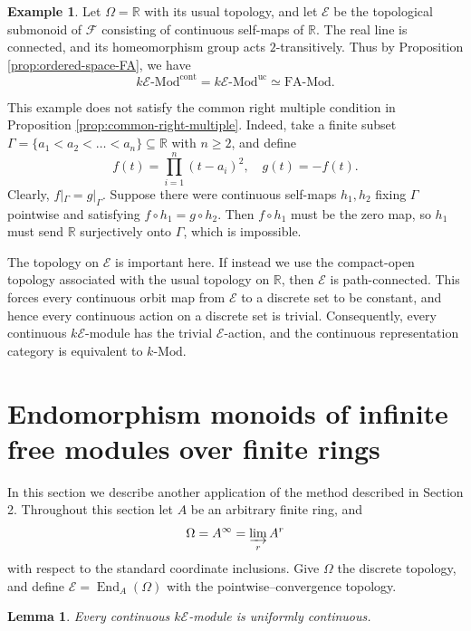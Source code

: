 \documentclass[10pt, reqno]{amsart}
\theoremstyle{plain}
\newtheorem{lemma}[theorem]{Lemma}
\numberwithin{equation}{section}
\theoremstyle{definition}
\newtheorem{example}[theorem]{Example}
\newcommand{\End}{\operatorname{End}}
\newcommand{\Mod}{{\textrm{-}\mathrm{Mod}}}
\newcommand{\FA}{\mathrm{FA}}
\newcommand{\E}{\mathscr E}
\begin{document}
\begin{example}\label{ex:real-line-FA}
Let $\Omega = \mathbb{R}$ with its usual topology, and let $\E$ be the topological submonoid of $\mathscr{F}$ consisting of continuous self-maps of $\mathbb{R}$. The real line is connected, and its
homeomorphism group acts $2$-transitively. Thus by Proposition \ref{prop:ordered-space-FA}, we have
\[
k\E \Mod^{\mathrm{cont}} = k\E \Mod^{\mathrm{uc}} \simeq \FA \Mod.
\]

This example does not satisfy the common right multiple condition in Proposition \ref{prop:common-right-multiple}. Indeed, take a finite subset $\Gamma = \{a_1 < a_2 < \ldots < a_n \} \subseteq \mathbb{R}$ with $n \geqslant 2$, and define
\[
f(t) = \prod_{i = 1}^n (t - a_i)^2, \quad g(t) = -f(t).
\]
Clearly, $f|_\Gamma = g|_\Gamma$. Suppose there were continuous self-maps $h_1, h_2$ fixing $\Gamma$ pointwise and satisfying $f \circ h_1 = g \circ h_2$. Then $f \circ h_1$ must be the zero map, so $h_1$ must send $\mathbb{R}$ surjectively onto $\Gamma$, which is impossible.

The topology on $\E$ is important here. If instead we use the compact-open topology associated with the usual topology on $\mathbb R$, then $\E$ is path-connected. This forces every continuous orbit map from $\E$ to a discrete set to be constant, and hence every continuous action on a discrete set is trivial. Consequently, every continuous $k\E$-module has the trivial $\E$-action, and the continuous representation category is equivalent to $k \Mod$.
\end{example}

\section{\texorpdfstring{Endomorphism}{Endomorphism} monoids of infinite free modules over finite rings}\label{sec:direct-finite-ring}

In this section we describe another application of the method described in Section 2. Throughout this section let $A$ be an arbitrary finite ring, and
\[
\Omega = A^{\infty}=\varinjlim_r A^r
\]
with respect to the standard coordinate inclusions. Give $\Omega$ the discrete topology, and define $\E = \End_A(\Omega)$ with the pointwise--convergence topology.

\begin{lemma}\label{prop:auto-finite-ring}
Every continuous $k\E$-module is uniformly continuous.
\end{lemma}
\end{document}
